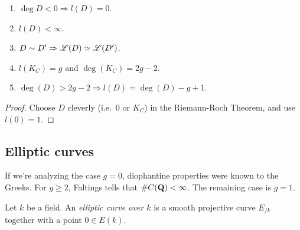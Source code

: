 \begin{theorem}\label{thm:basic-facts}
\begin{enumerate}
\item $\deg D<0\Rightarrow l(D)=0$. 
\item $l(D)<\infty$. 
\item $D\sim D'\Rightarrow \mathscr{L}(D)\simeq \mathscr{L}(D')$. 
\item $l(K_C)=g$ and $\deg(K_C)=2 g-2$. 
\item $\deg(D)>2 g-2\Rightarrow l(D)=\deg(D)-g+1$. 
\end{enumerate}
\end{theorem}
\begin{proof}Choose $D$ cleverly (i.e.~$0$ or $K_C$) in the Riemann-Roch 
Theorem, and use $l(0)=1$. 
\end{proof}





\subsection{Elliptic curves}

If we're analyzing the case $g=0$, diophantine properties were known to the 
Greeks. For $g\geqslant 2$, Faltings tells that $\#C(\mathbf{Q})<\infty$. The 
remaining case is $g=1$. 

\begin{definition}
Let $k$ be a field. An \emph{elliptic curve over $k$} is a smooth projective 
curve $E_{/k}$ together with a point $0\in E(k)$. 
\end{definition}

